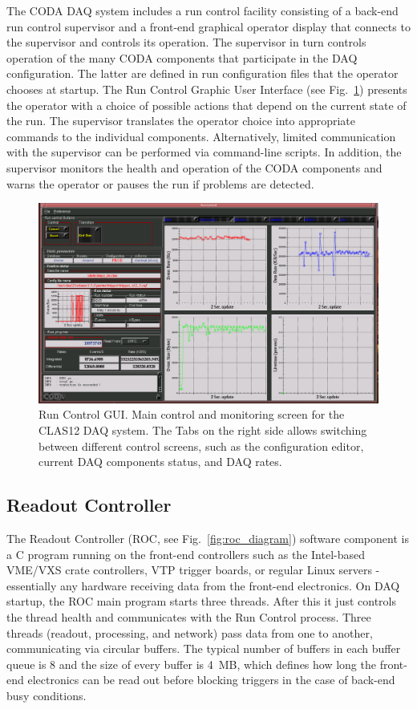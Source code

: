 The CODA DAQ system includes a run control facility consisting of a back-end run control supervisor and a front-end graphical operator display that connects to the supervisor and controls its operation. The supervisor in turn controls operation of the many CODA components that participate in the DAQ configuration. The latter are defined in run configuration files that the operator chooses at startup. The Run Control Graphic User Interface (see Fig.~\ref{fig:runcontrol1}) presents the operator with a choice of possible actions that depend on the current state of the run. The supervisor translates the operator choice into appropriate commands to the individual components. Alternatively, limited communication with the supervisor can be performed via command-line scripts. In addition, the supervisor monitors the health and operation of the CODA components and warns the operator or pauses the run if problems are detected.

\begin{figure}[hbt]
	\centering
	\includegraphics[width=1.0\columnwidth,keepaspectratio]{img/runcontrol1.png}
	\caption{Run Control GUI. Main control and monitoring screen for the CLAS12 DAQ system. The Tabs on the right side allows switching between different control screens, such as the configuration editor, current DAQ components status, and DAQ rates.}
	\label{fig:runcontrol1}
\end{figure}





\subsection{Readout Controller}

The Readout Controller (ROC, see Fig.~\ref{fig:roc_diagram}) software component is a C program running on the front-end controllers such as the Intel-based VME/VXS crate controllers, VTP trigger boards, or regular Linux servers - essentially any hardware receiving data from the front-end electronics. On DAQ startup, the ROC main program starts three threads. After this it just controls the thread health and communicates with the Run Control process. Three threads (readout, processing, and network) pass data from one to another, communicating via circular buffers. The typical number of buffers in each buffer queue is 8 and the size of every buffer is 4~MB, which defines how long the front-end electronics can be read out before blocking triggers in the case of back-end busy conditions.


